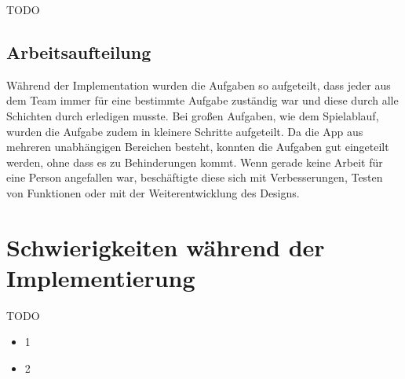 TODO

\subsection{Arbeitsaufteilung}
\label{sec:implementierung:architektur:arbeitsaufteilung}

Während der Implementation wurden die Aufgaben so aufgeteilt, dass jeder aus dem Team immer für eine bestimmte Aufgabe zuständig war und diese durch alle Schichten durch erledigen musste. Bei großen Aufgaben, wie dem Spielablauf, wurden die Aufgabe zudem in kleinere Schritte aufgeteilt. Da die App aus mehreren unabhängigen Bereichen besteht, konnten die Aufgaben gut eingeteilt werden, ohne dass es zu Behinderungen kommt. Wenn gerade keine Arbeit für eine Person angefallen war, beschäftigte diese sich mit Verbesserungen, Testen von Funktionen oder mit der Weiterentwicklung des Designs.

\section{Schwierigkeiten während der Implementierung}
\label{sec:implementierung:schwierigkeiten}	

TODO

\begin{itemize} 
\item 1
\item 2
\end{itemize}